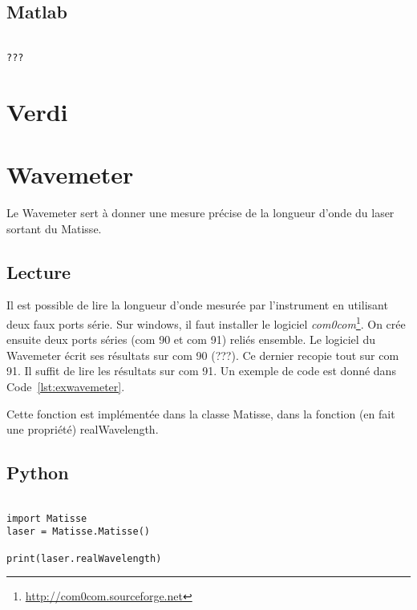 \documentclass[11pt,francais]{book} %
\begin{document}
\subsection{Matlab}

\begin{lstlisting}[frame=single,caption={Exemple d'utilisation du Trivista avec Matlab},label={lst:extrivista},breaklines=true,]  % Start your code-block

???
\end{lstlisting}


\section{Verdi}


\section{Wavemeter}

Le Wavemeter sert à donner une mesure précise de la longueur d'onde du laser sortant du Matisse.

\subsection{Lecture}
Il est possible de lire la longueur d'onde mesurée par l'instrument en utilisant deux faux ports série.
Sur windows, il faut installer le logiciel {\it com0com}\footnote{\url{http://com0com.sourceforge.net}}.
On crée ensuite deux ports séries (com 90 et com 91) reliés ensemble.
Le logiciel du Wavemeter écrit ses résultats sur com 90 (???).
Ce dernier recopie tout sur com 91.
Il suffit de lire les résultats sur com 91.
Un exemple de code est donné dans Code~\ref{lst:exwavemeter}.

Cette fonction est implémentée dans la classe Matisse, dans la fonction (en fait une propriété) realWavelength.

\subsection{Python}

\begin{lstlisting}[frame=single,caption={Exemple d'utilisation du Wavemeter avec Python},label={lst:exwavemeter},breaklines=true,]  % Start your code-block

import Matisse
laser = Matisse.Matisse()

print(laser.realWavelength)
\end{lstlisting}
\end{document}
